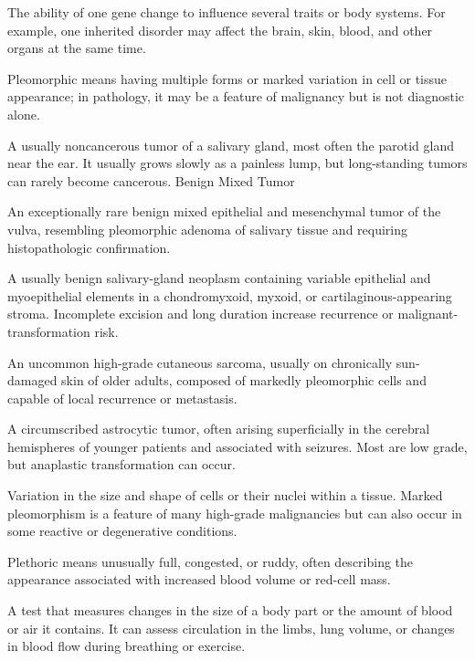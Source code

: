  The ability of one gene change to influence several traits or body systems. For example, one inherited disorder may affect the brain, skin, blood, and other organs at the same time.

 Pleomorphic means having multiple forms or marked variation in cell or tissue appearance; in pathology, it may be a feature of malignancy but is not diagnostic alone.

 A usually noncancerous tumor of a salivary gland, most often the parotid gland near the ear. It usually grows slowly as a painless lump, but long-standing tumors can rarely become cancerous.
\synonyms
Benign Mixed Tumor

 An exceptionally rare benign mixed epithelial and mesenchymal tumor of the vulva, resembling pleomorphic adenoma of salivary tissue and requiring histopathologic confirmation.

 A usually benign salivary-gland neoplasm containing variable epithelial and myoepithelial elements in a chondromyxoid, myxoid, or cartilaginous-appearing stroma. Incomplete excision and long duration increase recurrence or malignant-transformation risk.

 An uncommon high-grade cutaneous sarcoma, usually on chronically sun-damaged skin of older adults, composed of markedly pleomorphic cells and capable of local recurrence or metastasis.

 A circumscribed astrocytic tumor, often arising superficially in the cerebral hemispheres of younger patients and associated with seizures. Most are low grade, but anaplastic transformation can occur.

 Variation in the size and shape of cells or their nuclei within a tissue. Marked
pleomorphism is a feature of many high-grade malignancies but can also occur in some
reactive or degenerative conditions.

 Plethoric means unusually full, congested, or ruddy, often describing the appearance associated with increased blood volume or red-cell mass.

 A test that measures changes in the size of a body part or the amount of blood or air it contains. It can assess circulation in the limbs, lung volume, or changes in blood flow during breathing or exercise.

